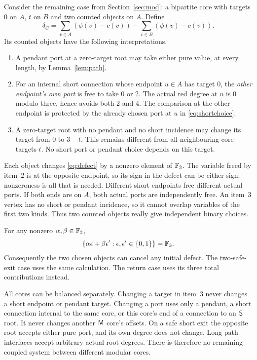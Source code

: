 Consider the remaining case from Section~\ref{sec:mod}: a bipartite
core with targets 0 on $A$, $t$ on $B$ and two counted objects on
$A$.  Define
\begin{equation}\label{eq:defect}
 \delta_C=\sum_{v\in A}(\phi(v)-c(v))-
           \sum_{v\in B}(\phi(v)-c(v)).
\end{equation}
Its counted objects have the following interpretations.
\begin{enumerate}
\item A pendant port at a zero-target root may take either pure
value, at every length, by Lemma~\ref{lem:path}.
\item For an internal short connection whose endpoint $u\in A$
has target 0, the \emph{other endpoint's own port} is free to take
0 or 2.  The actual red degree at $u$ is 0 modulo three, hence
avoids both 2 and 4.  The comparison at the other endpoint is
protected by the already chosen port at $u$ in \eqref{eq:shortchoice}.
\item A zero-target root with no pendant and no short incidence may
change its target from 0 to $3-t$.  This remains different from
all neighbouring core targets $t$.  No short port or pendant choice
depends on this target.
\end{enumerate}

Each object changes \eqref{eq:defect} by a nonzero element of $\mathbb F_3$.
The variable freed by item~2 is at the opposite endpoint, so its
sign in the defect can be either sign; nonzeroness is all that is
needed.  Different short endpoints free different actual ports.
If both ends are on $A$, both actual ports are independently free.
An item~3 vertex has no short or pendant incidence, so it cannot
overlap variables of the first two kinds.  Thus two counted objects
really give independent binary choices.

For any nonzero $\alpha,\beta\in\mathbb F_3$,
\begin{equation}\label{eq:binary}
 \{\alpha\epsilon+\beta\epsilon':
          \epsilon,\epsilon'\in\{0,1\}\}=\mathbb F_3.
\end{equation}
Consequently the two chosen objects can cancel any initial defect.
The two-safe-exit case uses the same calculation.  The return case
uses its three total contributions instead.

All cores can be balanced separately.  Changing a target in item~3
never changes a short endpoint or pendant target.  Changing a port
uses only a pendant, a short connection internal to the same core,
or this core's end of a connection to an $\mathsf S$ root.  It never
changes another $\mathsf M$ core's offsets.  On a safe short exit the
opposite root accepts either pure port, and its own degree does not
change.  Long path interfaces accept arbitrary actual root degrees.
There is therefore no remaining coupled system between different
modular cores.

